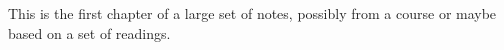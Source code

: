 \documentclass[../notes.tex]{subfiles}
\begin{document}
This is the first chapter of a large set of notes, possibly from a course or maybe based on a set of readings.
\end{document}
